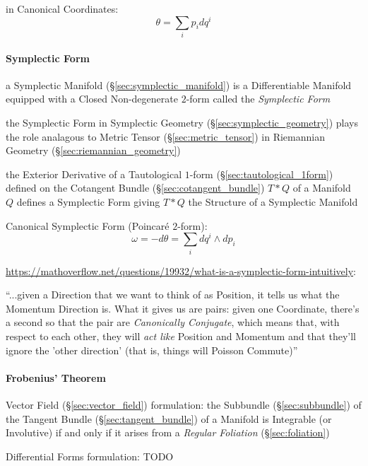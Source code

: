 in Canonical Coordinates:
\[
  \theta = \sum_i p_i dq^i
\]



\paragraph{Symplectic Form}\label{sec:symplectic_form}\hfill

a Symplectic Manifold (\S\ref{sec:symplectic_manifold}) is a Differentiable
Manifold equipped with a Closed Non-degenerate $2$-form called the
\emph{Symplectic Form}

the Symplectic Form in Symplectic Geometry (\S\ref{sec:symplectic_geometry})
plays the role analagous to Metric Tensor (\S\ref{sec:metric_tensor}) in
Riemannian Geometry (\S\ref{sec:riemannian_geometry})

the Exterior Derivative of a Tautological $1$-form
(\S\ref{sec:tautological_1form}) defined on the Cotangent Bundle
(\S\ref{sec:cotangent_bundle}) $T * Q$ of a Manifold $Q$ defines a Symplectic
Form giving $T * Q$ the Structure of a Symplectic Manifold

Canonical Symplectic Form (Poincar\'e $2$-form):
\[
  \omega = -d\theta = \sum_i dq^i \wedge dp_i
\]

\url{https://mathoverflow.net/questions/19932/what-is-a-symplectic-form-intuitively}:

``...given a Direction that we want to think of as Position, it tells us what
the Momentum Direction is. What it gives us are pairs: given one Coordinate,
there's a second so that the pair are \emph{Canonically Conjugate}, which means
that, with respect to each other, they will \emph{act like} Position and
Momentum and that they'll ignore the 'other direction' (that is, things will
Poisson Commute)''



\paragraph{Frobenius' Theorem}\label{sec:frobenius_theorem}\hfill

Vector Field (\S\ref{sec:vector_field}) formulation:
the Subbundle (\S\ref{sec:subbundle}) of the Tangent Bundle
(\S\ref{sec:tangent_bundle}) of a Manifold is Integrable (or Involutive) if and
only if it arises from a \emph{Regular Foliation} (\S\ref{sec:foliation})

Differential Forms formulation: TODO



